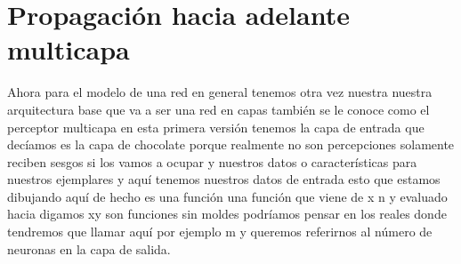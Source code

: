 \section{Propagación hacia adelante multicapa}


Ahora para el modelo de una red en general tenemos otra vez nuestra nuestra arquitectura base que va a ser una red en capas también se le conoce como el perceptor multicapa en esta primera versión tenemos la capa de entrada que decíamos es la capa de chocolate porque realmente no son percepciones solamente reciben sesgos si los vamos a ocupar y nuestros datos o características para nuestros ejemplares y aquí tenemos nuestros datos de entrada esto que estamos dibujando aquí de hecho es una función una función que viene de x n y evaluado hacia digamos xy son funciones sin moldes podríamos pensar en los reales donde tendremos que llamar aquí por ejemplo m y queremos referirnos al número de neuronas en la capa de salida. 
